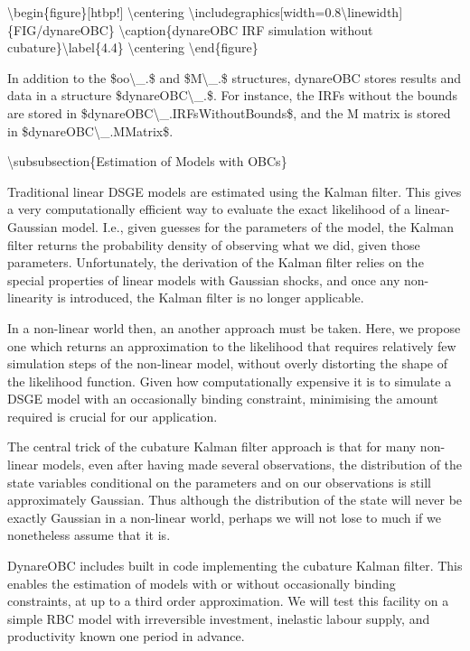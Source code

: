 \documentclass[10pt,math=newtx,citestyle=gb7714-2015,bibstyle=gb7714-2015]{elegantbook}
\begin{document}
	\textbackslash{}begin\{figure\}[htbp!]
	\textbackslash{}centering
	\textbackslash{}includegraphics[width=0.8\textbackslash{}linewidth]\{FIG/dynareOBC\}
	\textbackslash{}caption\{dynareOBC IRF simulation without cubature\}\textbackslash{}label\{4.4\}
	\textbackslash{}centering
	\textbackslash{}end\{figure\}
	
	In addition to the \$oo\textbackslash{}\_.\$ and \$M\textbackslash{}\_.\$ structures, dynareOBC stores results and data in a structure \$dynareOBC\textbackslash{}\_.\$. For instance, the IRFs without the bounds are stored in \$dynareOBC\textbackslash{}\_.IRFsWithoutBounds\$, and the M matrix is stored in \$dynareOBC\textbackslash{}\_.MMatrix\$.
	
	\textbackslash{}subsubsection\{Estimation of Models with OBCs\}
	
	Traditional linear DSGE models are estimated using the Kalman filter. This gives a very computationally efficient way to evaluate the exact likelihood of a linear-Gaussian model. I.e., given guesses for the parameters of the model, the Kalman filter returns the probability density of observing what we did, given those parameters. Unfortunately, the derivation of the Kalman filter relies on the special properties of linear models with Gaussian shocks, and once any non-linearity is introduced, the Kalman filter is no longer applicable.
	
	In a non-linear world then, an another approach must be taken. Here, we propose one which returns an approximation to the likelihood that requires relatively few simulation steps of the non-linear model, without overly distorting the shape of the likelihood function. Given how computationally expensive
	it is to simulate a DSGE model with an occasionally binding constraint, minimising the amount required is crucial for our application.
	
	The central trick of the cubature Kalman filter approach is that for many non-linear models, even after having made several observations, the distribution of the state variables conditional on the parameters and on our observations is still approximately Gaussian. Thus although the distribution of the
	state will never be exactly Gaussian in a non-linear world, perhaps we will not lose to much if we nonetheless assume that it is.
	
	DynareOBC includes built in code implementing the cubature Kalman filter. This enables the estimation of models with or without occasionally binding constraints, at up to a third order approximation. We will test this facility on a simple RBC model with irreversible investment, inelastic labour supply, and productivity known one period in advance.
	
\end{document}
